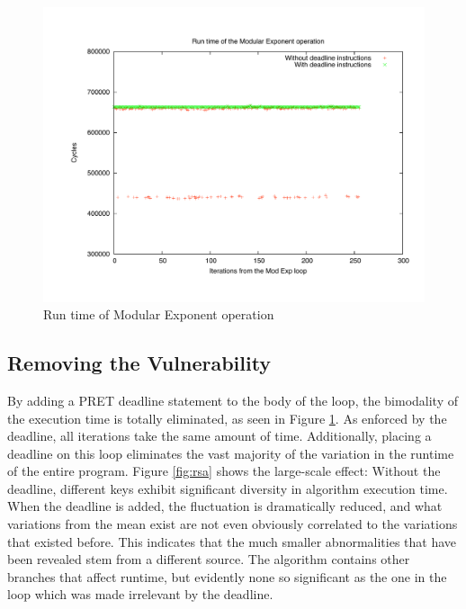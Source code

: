 \documentclass[times, 10pt,twocolumn]{article}
\begin{document}
\begin{figure}[ht]
  \centering
  \includegraphics[scale=.3]{./images/ModExp.pdf}
  \caption{Run time of Modular Exponent operation}
  \label{fig:modexp}
\end{figure}

\subsection{Removing the Vulnerability}
By adding a PRET deadline statement to the body of the loop, the bimodality of the execution time is totally eliminated, as seen in Figure \ref{fig:modexp}.  As enforced by the deadline, all iterations take the same amount of time.  Additionally, placing a deadline on this loop eliminates the vast majority of the variation in the runtime of the entire program.  Figure \ref{fig:rsa} shows the large-scale effect:  Without the deadline, different keys exhibit significant diversity in algorithm execution time.  When the deadline is added, the fluctuation is dramatically reduced, and what variations from the mean exist are not even obviously correlated to the variations that existed before.  This indicates that the much smaller abnormalities that have been revealed stem from a different source.  The algorithm contains other branches that affect runtime, but evidently none so significant as the one in the loop which was made irrelevant by the deadline.
\end{document}
